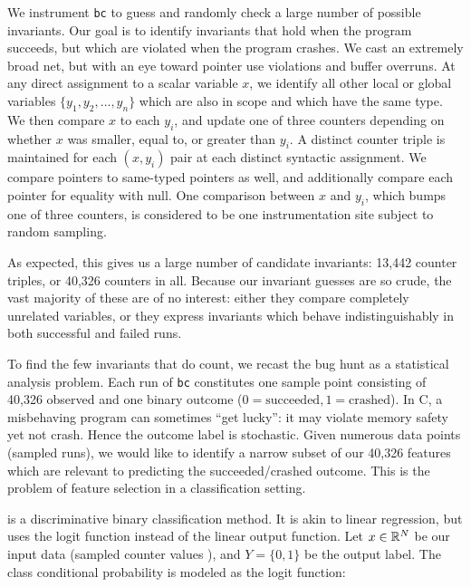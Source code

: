 We instrument \texttt{bc} to guess and randomly check a large number
of possible invariants.  Our goal is to identify invariants that hold
when the program succeeds, but which are violated when the program
crashes.  We cast an extremely broad net, but with an eye toward
pointer use violations and buffer overruns.  At any direct assignment
to a scalar variable $x$, we identify all other local or global
variables $\{ y_1, y_2, \dots, y_n \}$ which are also in scope and
which have the same type.  We then compare $x$ to each $y_i$, and
update one of three counters depending on whether $x$ was smaller,
equal to, or greater than $y_i$.  A distinct counter triple is
maintained for each $(x, y_i)$ pair at each distinct syntactic
assignment.  We compare pointers to same-typed pointers as well, and
additionally compare each pointer for equality with null.  One
comparison between $x$ and $y_i$, which bumps one of three counters,
is considered to be one instrumentation site subject to random
sampling.

As expected, this gives us a large number of candidate invariants:
13,442 counter triples, or 40,326 counters in all.  Because our
invariant guesses are so crude, the vast majority of these are of no
interest: either they compare completely unrelated variables, or they
express invariants which behave indistinguishably in both successful
and failed runs.

To find the few invariants that do count, we recast the bug hunt as a
statistical analysis problem.  Each run of \texttt{bc} constitutes one
sample point consisting of 40,326 observed  and one
binary outcome ($0 = \text{succeeded}, 1 = \text{crashed}$).  In C, a
misbehaving program can sometimes ``get lucky'': it may violate memory
safety yet not crash.  Hence the outcome label is stochastic.  Given
numerous data points (sampled runs), we would like to identify a
narrow subset of our 40,326 features which are relevant to predicting
the succeeded/crashed outcome.  This is the problem of feature
selection in a classification setting.

  is a discriminative binary classification method.  It is akin
to linear regression, but uses the logit function instead of the
linear output function.  Let $x \in \mathbb{R}^N$ be our input data
(sampled counter values ), and $Y = \{0, 1\}$ be the
output label.  The class conditional probability is modeled as the
logit function:

